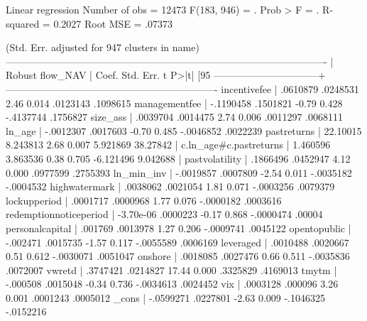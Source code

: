 Linear regression                                      Number of obs =   12473
                                                       F(183,   946) =       .
                                                       Prob > F      =       .
                                                       R-squared     =  0.2027
                                                       Root MSE      =  .07373

                                                    (Std. Err. adjusted for 947 clusters in name)
-------------------------------------------------------------------------------------------------
                        |               Robust
               flow_NAV |      Coef.   Std. Err.      t    P>|t|     [95%
--------------------------------+----------------------------------------------------------------
           incentivefee |   .0610879   .0248531     2.46   0.014     .0123143    .1098615
          managementfee |  -.1190458   .1501821    -0.79   0.428    -.4137744    .1756827
               size_ass |   .0039704   .0014475     2.74   0.006     .0011297    .0068111
                 ln_age |  -.0012307   .0017603    -0.70   0.485    -.0046852    .0022239
            pastreturns |   22.10015   8.243813     2.68   0.007     5.921869    38.27842
                        |
 c.ln_age#c.pastreturns |   1.460596   3.863536     0.38   0.705    -6.121496    9.042688
                        |
         pastvolatility |   .1866496   .0452947     4.12   0.000     .0977599    .2755393
             ln_min_inv |  -.0019857   .0007809    -2.54   0.011    -.0035182   -.0004532
          highwatermark |   .0038062   .0021054     1.81   0.071    -.0003256    .0079379
           lockupperiod |   .0001717   .0000968     1.77   0.076    -.0000182    .0003616
 redemptionnoticeperiod |  -3.70e-06   .0000223    -0.17   0.868    -.0000474      .00004
        personalcapital |    .001769   .0013978     1.27   0.206    -.0009741    .0045122
           opentopublic |   -.002471   .0015735    -1.57   0.117    -.0055589    .0006169
              leveraged |   .0010488   .0020667     0.51   0.612    -.0030071    .0051047
                onshore |   .0018085   .0027476     0.66   0.511    -.0035836    .0072007
                 vwretd |   .3747421   .0214827    17.44   0.000     .3325829    .4169013
                  tmytm |   -.000508   .0015048    -0.34   0.736    -.0034613    .0024452
                    vix |   .0003128    .000096     3.26   0.001     .0001243    .0005012
                  _cons |  -.0599271   .0227801    -2.63   0.009    -.1046325   -.0152216
